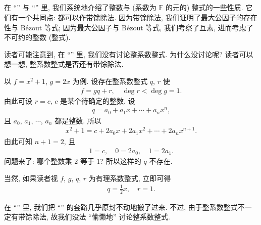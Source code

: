 \subsection*{\PolynomialsOverZAndOverQ}
\markright{\PolynomialsOverZAndOverQ}

在 ``\SomePropertiesOfIntegers'' 与 ``\SomePropertiesOfPolynomials'' 里, 我们系统地介绍了整数与 (系数为 $\mathbb{F}$ 的元的) 整式的一些性质. 它们有一个共同点: 都可以作带馀除法. 因为带馀除法, 我们证明了最大公因子的存在性与 Bézout 等式; 因为最大公因子与 Bézout 等式, 我们考察了互素, 进而考虑了不可约的整数 (整式).

读者可能注意到, 在 ``\SomePropertiesOfPolynomials'' 里, 我们没有讨论整系数整式. 为什么没讨论呢? 读者可以想一想, 整系数整式是否还有带馀除法.

\begin{example}
    以 $f = x^2 + 1$, $g = 2x$ 为例. 设存在整系数整式 $q$, $r$ 使
    \begin{align*}
        f = gq + r, \quad \deg r < \deg g = 1.
    \end{align*}
    由此可设 $r = c$, $c$ 是某个待确定的整数. 设
    \begin{align*}
        q = a_0 + a_1 x + \cdots + a_n x^n,
    \end{align*}
    且 $a_0$, $a_1$, $\cdots$, $a_n$ 都是整数. 所以
    \begin{align*}
        x^2 + 1 = c + 2a_0 x + 2a_1 x^2 + \cdots + 2a_n x^{n+1}.
    \end{align*}
    由此可知 $n+1 = 2$, 且
    \begin{align*}
        1 = c, \quad 0 = 2a_0, \quad 1 = 2a_1.
    \end{align*}
    问题来了: 哪个整数乘 $2$ 等于 $1$? 所以这样的 $q$ 不存在.

    当然, 如果读者视 $f$, $g$, $q$, $r$ 为有理系数整式, 立即可得
    \begin{align*}
        q = \frac{1}{2}x, \quad r = 1.
    \end{align*}
\end{example}

在 ``\SomePropertiesOfPolynomials'' 里, 我们把 ``\SomePropertiesOfIntegers'' 的套路几乎原封不动地搬了过来. 不过, 由于整系数整式不一定有带馀除法, 故我们没法 ``偷懒地'' 讨论整系数整式.

